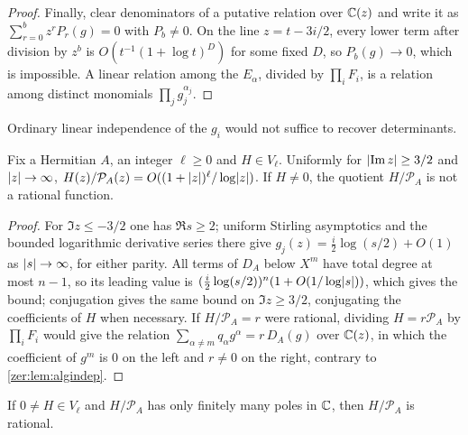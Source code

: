 \begin{proof}
Finally, clear denominators of a putative relation over $\mathbb{C}(z)$ and write it as
$\sum_{r=0}^bz^rP_r(g)=0$ with $P_b\ne0$. On the line $z=t-3i/2$, every lower term after division by $z^b$
is $O(t^{-1}(1+\log t)^{D})$ for some fixed $D$, so $P_b(g)\to0$, which is impossible. A linear relation
among the $E_\alpha$, divided by $\prod_iF_i$, is a relation among distinct monomials $\prod_jg_j^{\alpha_j}$.
\end{proof}

Ordinary linear independence of the $g_i$ would not suffice to recover determinants.

\begin{lemma}\label{zer:lem:outside}
Fix a Hermitian $A$, an integer $\ell\ge0$ and $H\in V_\ell$. Uniformly for $\lvert\operatorname{Im} z\rvert\ge3/2$ and
$\lvert z\rvert\to\infty$, $H(z)/\mathcal P_A(z)=O((1+\lvert z\rvert)^\ell/\log\lvert z\rvert)$. If $H\ne0$, the quotient
$H/\mathcal P_A$ is not a rational function.
\end{lemma}

\begin{proof}
For $\Im z\le-3/2$ one has $\Re s\ge2$; uniform Stirling asymptotics and the bounded logarithmic
derivative series there give $g_j(z)=\tfrac i2\log(s/2)+O(1)$ as $\lvert s\rvert\to\infty$, for either parity.
All terms of $D_A$ below $X^m$ have total degree at most $n-1$, so its leading value is
$(\tfrac i2\log(s/2))^n(1+O(1/\log\lvert s\rvert))$, which gives the bound; conjugation gives the same bound on
$\Im z\ge3/2$, conjugating the coefficients of $H$ when necessary. If $H/\mathcal P_A=r$ were rational,
dividing $H=r\mathcal P_A$ by $\prod_iF_i$ would give the relation
$\sum_{\alpha\ne m}q_\alpha g^\alpha=r\,D_A(g)$ over $\mathbb{C}(z)$, in which the coefficient of $g^m$ is $0$ on
the left and $r\ne0$ on the right, contrary to \cref{zer:lem:algindep}.
\end{proof}

\begin{lemma}\label{zer:lem:invrational}
If $0\ne H\in V_\ell$ and $H/\mathcal P_A$ has only finitely many poles in $\mathbb{C}$, then $H/\mathcal P_A$ is
rational.
\end{lemma}

